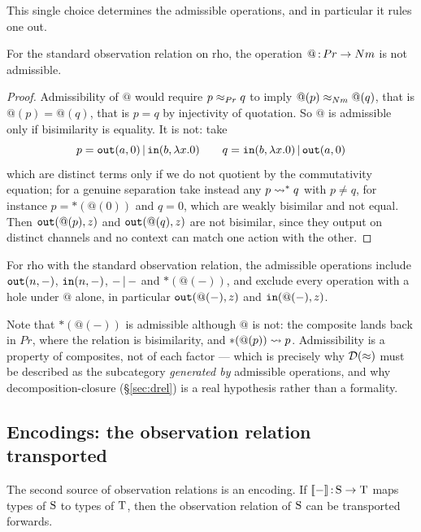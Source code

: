 \documentclass{article}
\begin{document}
This single choice determines the admissible operations, and in particular it rules one out.

\begin{proposition}
\label{prop:at}
    For the standard observation relation on rho, the operation $@\,{:}\, Pr\to Nm$ is not admissible.
\end{proposition}
\begin{proof}
    Admissibility of $@$ would require $p\approx_{Pr}q$ to imply $@(p)\approx_{Nm}@(q)$, that is $@(p)=@(q)$, that is $p=q$ by injectivity of quotation. So $@$ is admissible only if bisimilarity is equality. It is not: take
    \[p = \mathtt{out}(a,0)\,|\, \mathtt{in}(b,\lambda x.0)\qquad q = \mathtt{in}(b,\lambda x.0)\,|\, \mathtt{out}(a,0)\]
    which are distinct terms only if we do not quotient by the commutativity equation; for a genuine separation take instead any $p\rightsquigarrow^\ast q$ with $p\neq q$, for instance $p=\ast(@(0))$ and $q=0$, which are weakly bisimilar and not equal. Then $\mathtt{out}(@(p),z)$ and $\mathtt{out}(@(q),z)$ are not bisimilar, since they output on distinct channels and no context can match one action with the other.
\end{proof}

\begin{corollary}
\label{cor:rhoD}
    For rho with the standard observation relation, the admissible operations include $\mathtt{out}(n,-)$, $\mathtt{in}(n,-)$, $-\,|\,-$ and $\ast(@(-))$, and exclude every operation with a hole under $@$ alone, in particular $\mathtt{out}(@(-),z)$ and $\mathtt{in}(@(-),z)$.
\end{corollary}

Note that $\ast(@(-))$ is admissible although $@$ is not: the composite lands back in $Pr$, where the relation is bisimilarity, and $\ast(@(p))\rightsquigarrow p$. Admissibility is a property of composites, not of each factor --- which is precisely why $\mathcal{D}(\approx)$ must be described as the subcategory \emph{generated by} admissible operations, and why decomposition-closure (\S\ref{sec:drel}) is a real hypothesis rather than a formality.

\subsection{Encodings: the observation relation transported}

The second source of observation relations is an encoding. If $[\![-]\!]\,{:}\, \mathrm{S}\to\mathrm{T}$ maps types of $\mathrm{S}$ to types of $\mathrm{T}$, then the observation relation of $\mathrm{S}$ can be transported forwards.
\end{document}
